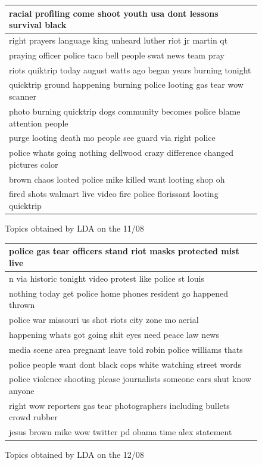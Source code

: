 \documentclass[a4paper,12pt]{report}
\begin{document}
\begin{figure}[H]
  \centering
\begin{tabular}{l}
\hline
racial profiling come shoot youth usa dont lessons survival black \\ \hline
right prayers language king unheard luther riot jr martin qt \\ \hline
praying officer police taco bell people swat news team pray \\ \hline
riots quiktrip today august watts ago began years burning tonight \\ \hline
quicktrip ground happening burning police looting gas tear wow scanner \\ \hline
photo burning quicktrip dogs community becomes police blame attention people \\ \hline
purge looting death mo people see guard via right police \\ \hline
police whats going nothing dellwood crazy difference changed pictures color \\ \hline
brown chaos looted police mike killed want looting shop oh \\ \hline
fired shots walmart live video fire police florissant looting quicktrip \\ \hline
\end{tabular}
\caption{Topics obtained by LDA on the 11/08}
\end{figure}


\begin{figure}[H]
  \centering
\begin{tabular}{l}
\hline
police gas tear officers stand riot masks protected mist live \\ \hline
n via historic tonight video protest like police st louis \\ \hline
nothing today get police home phones resident go happened thrown \\ \hline
police war missouri us shot riots city zone mo aerial \\ \hline
happening whats got going shit eyes need peace law news \\ \hline
media scene area pregnant leave told robin police williams thats \\ \hline
police people want dont black cops white watching street words \\ \hline
police violence shooting please journalists someone cars shut know anyone \\ \hline
right wow reporters gas tear photographers including bullets crowd rubber \\ \hline
jesus brown mike wow twitter pd obama time alex statement \\ \hline
\end{tabular}
\caption{Topics obtained by LDA on the 12/08}
\end{figure}
\end{document}
